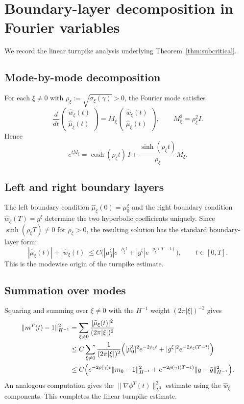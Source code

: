 \documentclass[11pt]{amsart}
\theoremstyle{definition}
\theoremstyle{remark}
\newcommand{\phiT}{\phi^T}
\newcommand{\mT}{m^T}
\newcommand{\grad}{\nabla}
\begin{document}
\appendix

\section{Boundary-layer decomposition in Fourier variables}
\label{app:linear-turnpike}

We record the linear turnpike analysis underlying Theorem~\ref{thm:subcritical}.

\subsection{Mode-by-mode decomposition}
\label{app:modes}

For each $\xi\neq 0$ with $\rho_\xi:=\sqrt{\sigma_\xi(\gamma)}>0$, the Fourier mode satisfies
\[
\frac{d}{dt}
\begin{pmatrix}\widehat w_\xi(t)\\\widehat\mu_\xi(t)\end{pmatrix}
=
M_\xi
\begin{pmatrix}\widehat w_\xi(t)\\\widehat\mu_\xi(t)\end{pmatrix},
\qquad
M_\xi^2=\rho_\xi^2 I.
\]
Hence
\[
e^{tM_\xi}
=
\cosh(\rho_\xi t)\,I+\frac{\sinh(\rho_\xi t)}{\rho_\xi}M_\xi.
\]

\subsection{Left and right boundary layers}
\label{app:layers}

The left boundary condition $\widehat\mu_\xi(0)=\mu_0^\xi$ and the right boundary condition
$\widehat w_\xi(T)=g^\xi$ determine the two hyperbolic coefficients uniquely. Since
$\sinh(\rho_\xi T)\neq 0$ for $\rho_\xi>0$, the resulting solution has the standard boundary-layer form:
\[
|\widehat\mu_\xi(t)|+|\widehat w_\xi(t)|
\le
C\bigl(|\mu_0^\xi|e^{-\rho_\xi t}+|g^\xi|e^{-\rho_\xi(T-t)}\bigr),
\qquad t\in[0,T].
\]
This is the modewise origin of the turnpike estimate.

\subsection{Summation over modes}
\label{app:summation}

Squaring and summing over $\xi\neq 0$ with the $H^{-1}$ weight $(2\pi|\xi|)^{-2}$ gives
\begin{align*}
\|\mT(t)-1\|_{H^{-1}}^2
&=\sum_{\xi\neq 0}\frac{|\widehat\mu_\xi(t)|^2}{(2\pi|\xi|)^2}\\
&\le C\sum_{\xi\neq 0}\frac{1}{(2\pi|\xi|)^2}
\Bigl(|\mu_0^\xi|^2 e^{-2\rho_\xi t}+|g^\xi|^2e^{-2\rho_\xi(T-t)}\Bigr)\\
&\le C\Bigl(e^{-2\rho(\gamma) t}\|m_0-1\|_{H^{-1}}^2
+ e^{-2\rho(\gamma)(T-t)}\|g-\bar g\|_{H^{-1}}^2\Bigr).
\end{align*}
An analogous computation gives the $\|\grad\phiT(t)\|_{L^2}^2$ estimate using the $\widehat w_\xi$ components. This completes the linear turnpike estimate.
\end{document}
